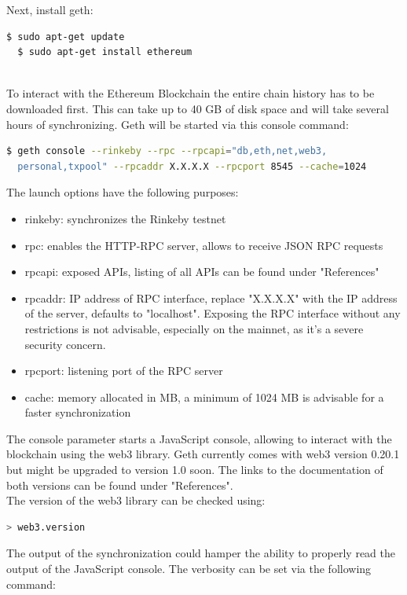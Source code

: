 Next, install geth:
\begin{lstlisting}[language=bash]
  $ sudo apt-get update
  $ sudo apt-get install ethereum
\end{lstlisting}
\leavevmode
\\
To interact with the Ethereum Blockchain the entire chain history has to be downloaded first. This can take up to 40 GB of disk space and will take several hours of synchronizing. Geth will be started via this console command:
\begin{lstlisting}[language=bash, showstringspaces=false]
  $ geth console --rinkeby --rpc --rpcapi="db,eth,net,web3,
  personal,txpool" --rpcaddr X.X.X.X --rpcport 8545 --cache=1024
\end{lstlisting}

The launch options have the following purposes\cite{cli-options}:
\begin{itemize}
    \item rinkeby: synchronizes the Rinkeby testnet
    \item rpc: enables the HTTP-RPC server, allows to receive JSON RPC requests
    \item rpcapi: exposed APIs, listing of all APIs can be found under "References"\cite{json-rpc}\cite{management-apis}
    \item rpcaddr: IP address of RPC interface, replace "X.X.X.X" with the IP address of the server, defaults to "localhost". Exposing the RPC interface without any restrictions is not advisable, especially on the mainnet, as it’s a severe security concern.
    \item rpcport: listening port of the RPC server
    \item cache: memory allocated in MB, a minimum of 1024 MB is advisable for a faster synchronization
\end{itemize}
The console parameter starts a JavaScript console, allowing to interact with the blockchain using the web3 library. Geth currently comes with web3 version 0.20.1\cite{javascript-0.20} but might be upgraded to version 1.0\cite{javascript-1.0} soon. The links to the documentation of both versions can be found under "References".
\\
The version of the web3 library can be checked using:

\begin{lstlisting}[language=bash]
  > web3.version
\end{lstlisting}

The output of the synchronization could hamper the ability to properly read the output of the JavaScript console. The verbosity can be set via the following command:

